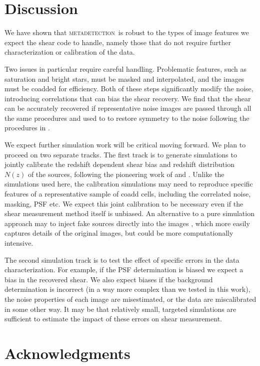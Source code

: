 \documentclass[twocolumn,twocolappendix,astrosym]{openjournal}
\newcommand{\mdet}{\textsc{metadetection}}
\begin{document}
\section{Discussion} \label{sec:summary}

We have shown that \mdet\ is robust to the types of image features we expect
the shear code to handle, namely those that do not require further
characterization or calibration of the data.

Two issues in particular require careful handling.  Problematic features, such
as saturation and bright stars, must be masked and interpolated, and the images
must be coadded for efficiency. Both of these steps significantly modify the
noise, introducing correlations that can bias the shear recovery.  We find that
the shear can be accurately recovered if representative noise images are passed
through all the same procedures and used to to restore symmetry to the
noise following the procedures in \cite{SheldonMcal2017}.

We expect further simulation work will be critical moving forward.  We plan to
proceed on two separate tracks.  The first track is to generate simulations to
jointly calibrate the redshift dependent shear bias and redshift distribution
$N(z)$ of the sources, following the pioneering work of \cite{MacCrann2022} and
\cite{LiNofz2022}.  Unlike the simulations used here, the calibration
simulations may need to reproduce specific features of a representative sample
of coadd cells, including the correlated noise, masking, PSF etc.  We expect
this joint calibration to be necessary even if the shear measurement method
itself is unbiased.  An alternative to a pure simulation approach may to inject
fake sources directly into the images
\citep{SuchytaBalrog2016,EverettBalrog2022}, which more easily captures details
of the original images, but could be more computationally intensive.

The second simulation track is to test the effect of specific errors in the
data characterization.  For example, if the PSF determination is biased we
expect a bias in the recovered shear.  We also expect biases if the background
determination is incorrect (in a way more complex than we tested in this work),
the noise properties of each image are misestimated, or the data are
miscalibrated in some other way.  It may be that relatively small, targeted
simulations are sufficient to estimate the impact of these errors on
shear measurement.

\section*{Acknowledgments}
\end{document}
